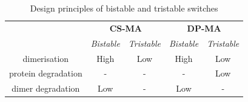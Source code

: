 {\begin{table}[]
\centering
\caption{Design principles of bistable and tristable switches}
\label{tab:des_prin}
\begin{tabular}{@{}ccccc@{}}
\toprule
                    & \multicolumn{2}{c}{\textbf{CS-MA}} & \multicolumn{2}{c}{\textbf{DP-MA}} \\ \cmidrule(l){2-3}\cmidrule(l){4-5}
                    & \textit{Bistable}    & \textit{Tristable}   & \textit{Bistable}    & \textit{Tristable}   \\\cmidrule(l){2-2}\cmidrule(l){3-3}\cmidrule(l){4-4}\cmidrule(l){5-5}
dimerisation        & High        & Low         & High        & Low         \\
protein degradation & -           & -           & -           & Low         \\
dimer degradation   & Low         & -           & Low         & -           \\\bottomrule
\end{tabular}
\end{table}


}
